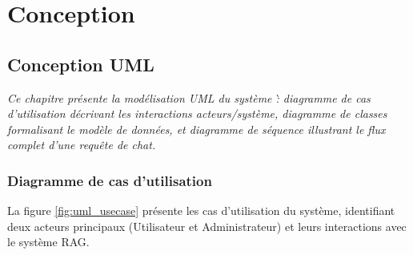 \documentclass[12pt,a4paper,oneside]{report}
\newcommand{\chaptercolor}{mainblue}
\newcommand{\setchaptercolor}[1]{\renewcommand{\chaptercolor}{#1}}
\newcommand{\chapterabstract}[1]{\vspace{-0.5cm}\begin{center}\begin{minipage}{0.9\textwidth}\small\itshape\textcolor{\chaptercolor!70!black}{#1}\end{minipage}\end{center}\vspace{0.5cm}}
\begin{document}






\part{Conception}

\setchaptercolor{teal}

\chapter{Conception UML}

\chapterabstract{Ce chapitre pr\'{e}sente la mod\'{e}lisation UML du syst\`{e}me \`: diagramme de cas d'utilisation d\'{e}crivant les interactions acteurs/syst\`{e}me, diagramme de classes formalisant le mod\`{e}le de donn\'{e}es, et diagramme de s\'{e}quence illustrant le flux complet d'une requ\^{e}te de chat.}

\section{Diagramme de cas d'utilisation}

La figure \ref{fig:uml_usecase} pr\'{e}sente les cas d'utilisation du syst\`{e}me, identifiant deux acteurs principaux (Utilisateur et Administrateur) et leurs interactions avec le syst\`{e}me RAG.
\end{document}
